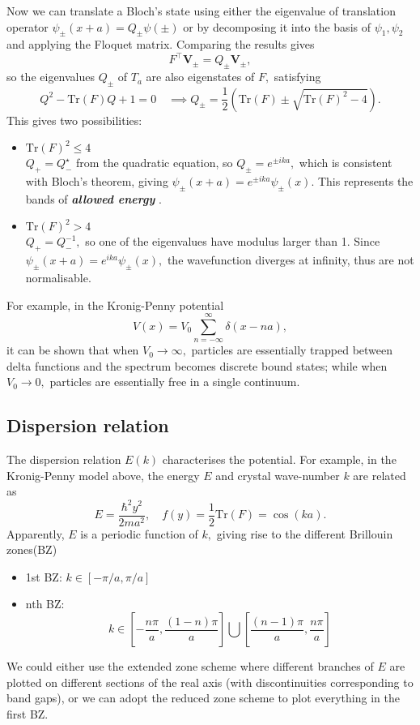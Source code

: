 \documentclass{article}
\theoremstyle{nonumberplain}
\begin{document}
Now we can translate a Bloch's state using either the eigenvalue of translation operator $\psi_{\pm} (x+a) = Q_{\pm} \psi(\pm)$ or by decomposing it into the basis of ${\psi_1, \psi_2}$ and applying the Floquet matrix. Comparing the results gives
\[
    F^{\top} \mathbf{V}_{\pm} = Q_{\pm} \mathbf{V}_{\pm}, 
\] 
so the eigenvalues $Q_{\pm}$ of $T_a$ are also eigenstates of $F,$ satisfying
\[
    \boxed{Q^2 - \mathrm{Tr}(F) Q + 1 =0 } \quad 
    \implies 
    Q_\pm = \frac{1}{2} (\mathrm{Tr}(F) \pm \sqrt{\mathrm{Tr}(F)^2 -4} ).  
\]
This gives two possibilities:
\begin{itemize}
    \item \(\mathrm{Tr}(F)^2 \leq  4\) \\
    \( Q_{+} = Q_{-}^{\star} \) from the quadratic equation, so $Q_{\pm} = e^{\pm i k a},$ which is consistent with Bloch's theorem, giving $\psi_{\pm} (x+a) = e^{\pm ik a} \psi_{\pm} (x). $ This represents the bands of \textit{\textbf{allowed energy}} .  
    \item  \(\mathrm{Tr}(F)^2 > 4\) \\
    \(Q_{+} = Q_{-}^{-1},\) so one of the eigenvalues have modulus larger than 1. Since $\psi_{\pm}(x+a) = e^{i k a} \psi_{\pm}(x),$ the wavefunction diverges at infinity, thus are not normalisable.  
\end{itemize}

For example, in the Kronig-Penny potential 
\[
    V(x) = V_0 \sum_{n=-\infty }^{\infty} \delta(x - n a), 
\]
it can be shown that when $V_0 \to \infty,$ particles are essentially trapped between delta functions and the spectrum becomes discrete bound states; while when $V_0 \to 0,$ particles are essentially free in a single continuum. 

\subsection{Dispersion relation}
The dispersion relation $E(k)$ characterises the potential. For example, in the Kronig-Penny model above, the energy $E$ and crystal wave-number $k$ are related as
\[
    E = \frac{\hbar ^{2} y^{2} }{2ma^{2} }, \quad 
    f(y) = \frac{1}{2}\mathrm{Tr}(F) = \cos (k a).  
\]
Apparently, $E$ is a periodic function of $k,$ giving rise to the different Brillouin zones(BZ)
\begin{itemize}
    \item 1st BZ: \(k \in [-\pi/a, \pi /a]\) 
    \item nth BZ: 
    \[k \in \left[-\frac{n \pi }{a}, \frac{(1-n) \pi }{a}\right] \bigcup \left[ \frac{(n-1)\pi}{a}, \frac{n \pi }{a}\right]\]
\end{itemize}

We could either use the extended zone scheme where different branches of $E$ are plotted on different sections of the real axis (with discontinuities corresponding to band gaps), or we can adopt the reduced zone scheme to plot everything in the first BZ. 
\end{document}
